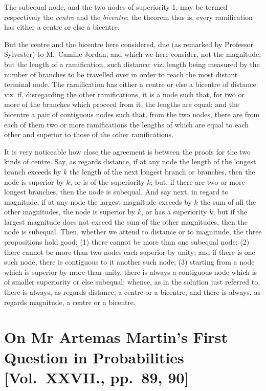 \documentclass[11pt,a4paper]{book}
\begin{document}
\begin{solution}
The subequal node, and the two nodes of superiority 1, may be termed respectively the \textit{centre} and the \textit{bicentre}; the theorem thus is, every ramification has either a centre or else a bicentre.

But the centre and the bicentre here considered, due (as remarked by Professor Sylvester) to M.~Camille Jordan, and which we here consider, not the magnitude, but the length of a ramification, such distance: viz. length being measured by the number of branches to be travelled over in order to reach the most distant terminal node. The ramification has either a centre or else a bicentre of distance: viz. if, disregarding the other ramifications, it is a node such that, for two or more of the branches which proceed from it, the lengths are equal; and the bicentre a pair of contiguous nodes such that, from the two nodes, there are from each of them two or more ramifications the lengths of which are equal to each other and superior to those of the other ramifications.

It is very noticeable how close the agreement is between the proofs for the two kinds of centre. Say, as regards distance, if at any node the length of the longest branch exceeds by $k$ the length of the next longest branch or branches, then the node is superior by $k$, or is of the superiority $k$; but, if there are two or more longest branches, then the node is subequal. And say next, in regard to magnitude, if at any node the largest magnitude exceeds by $k$ the sum of all the other magnitudes, the node is superior by $k$, or has a superiority $k$; but if the largest magnitude does not exceed the sum of the other magnitudes, then the node is subequal. Then, whether we attend to distance or to magnitude, the three propositions hold good: (1) there cannot be more than one subequal node; (2) there cannot be more than two nodes each superior by unity; and if there is one such node, there is contiguous to it another such node; (3) starting from a node which is superior by more than unity, there is always a contiguous node which is of smaller superiority or else subequal; whence, as in the solution just referred to, there is always, as regards distance, a centre or a bicentre; and there is always, as regards magnitude, a centre or a bicentre.
\end{solution}

\newpage

\section*{On Mr Artemas Martin's First Question in Probabilities [Vol.~XXVII., pp.~89, 90]}
\end{document}
